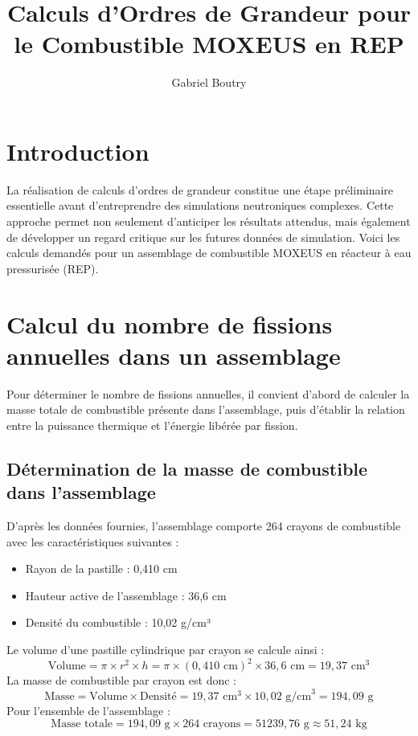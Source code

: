 \documentclass{article}
\author{Gabriel Boutry}
\title{Calculs d'Ordres de Grandeur pour le Combustible MOXEUS en REP}
\begin{document}
\maketitle

\section*{Introduction}
La réalisation de calculs d'ordres de grandeur constitue une étape préliminaire essentielle avant d'entreprendre des simulations neutroniques complexes. Cette approche permet non seulement d'anticiper les résultats attendus, mais également de développer un regard critique sur les futures données de simulation. Voici les calculs demandés pour un assemblage de combustible MOXEUS en réacteur à eau pressurisée (REP).

\section{Calcul du nombre de fissions annuelles dans un assemblage}
Pour déterminer le nombre de fissions annuelles, il convient d'abord de calculer la masse totale de combustible présente dans l'assemblage, puis d'établir la relation entre la puissance thermique et l'énergie libérée par fission.

\subsection{Détermination de la masse de combustible dans l'assemblage}
D'après les données fournies, l'assemblage comporte 264 crayons de combustible avec les caractéristiques suivantes :
\begin{itemize}
  \item Rayon de la pastille : 0,410 cm
  \item Hauteur active de l'assemblage : 36,6 cm
  \item Densité du combustible : 10,02 g/cm³
\end{itemize}
Le volume d'une pastille cylindrique par crayon se calcule ainsi :
\begin{equation}
  \text{Volume} = \pi \times r^2 \times h = \pi \times (0,410 \text{ cm})^2 \times 36,6 \text{ cm} = 19,37 \text{ cm}^3
\end{equation}
La masse de combustible par crayon est donc :
\begin{equation}
  \text{Masse} = \text{Volume} \times \text{Densité} = 19,37 \text{ cm}^3 \times 10,02 \text{ g/cm}^3 = 194,09 \text{ g}
\end{equation}
Pour l'ensemble de l'assemblage :
\begin{equation}
  \text{Masse totale} = 194,09 \text{ g} \times 264 \text{ crayons} = 51 239,76 \text{ g} \approx 51,24 \text{ kg}
\end{equation}
\end{document}
